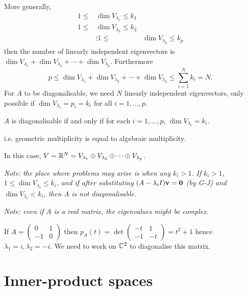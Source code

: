 \documentclass[10pt, a4paper]{article}
\begin{document}
More generally,
\begin{align*}
    1 \leq &\dim{V_{\lambda_1}} \leq k_1 \\
    1 \leq &\dim{V_{\lambda_2}} \leq k_2 \\
    &\vdots
    1 \leq &\dim{V_{\lambda_p}} \leq k_p
\end{align*}
then the number of linearly independent eigenvectors is $\dim{V_{\lambda_1}} + \dim{V_{\lambda_2}} + \dotsi + \dim{V_{\lambda_p}}$.
Furthermore
\[
p \leq \dim{V_{\lambda_1}} + \dim{V_{\lambda_2}} + \dotsi + \dim{V_{\lambda_p}} \leq \sum_{i = 1}^{N}k_i = N.
\]
For $A$ to be diagonalisable,
we need $N$ linearly independent eigenvectors,
only possible if $\dim{V_{\lambda_i}} = p_i = k_i$ for all $i = 1, \dotsc, p$.

\begin{proposition}
    $A$ is diagonalisable if and only if for each $i = 1, \dotsc, p$,
    $\dim{V_{\lambda_i}} = k_i$.

    i.e.
    geometric multiplicity is equal to algebraic multiplicity.
\end{proposition}

In this case,
$V = \mathbb{R} ^ N = V_{\lambda_1} \oplus V_{\lambda_2} \oplus \dotsi \oplus V_{\lambda_p}$.

\textit{Note:
the place where problems may arise is when any $k_i > 1$.
If $k_i > 1$,
$1 \leq \dim{V_{\lambda_i}} \leq k_i$,
and if after substituting $(A - \lambda_i I)\mathbf{v} = \mathbf{0}$
(by G-J)
and $\dim{V_{\lambda_i}} < k_i$,
then $A$ is not diagonalisable.}

\textit{Note:
even if $A$ is a real matrix,
the eigenvalues might be complex.}
\begin{example}
    If $A = \begin{pmatrix}
        0 & 1 \\ -1 & 0
    \end{pmatrix}$ then $p_A(t) = \det\begin{pmatrix}
        -t & 1 \\ -1 & -t
    \end{pmatrix} = t ^ 2 + 1$
    hence $\lambda_1 = i, \lambda_2 = -i$.
    We need to work on $\mathbb{C} ^ 2$ to diagonalise this matrix.
\end{example}

\newpage

\section{Inner-product spaces}
\end{document}
